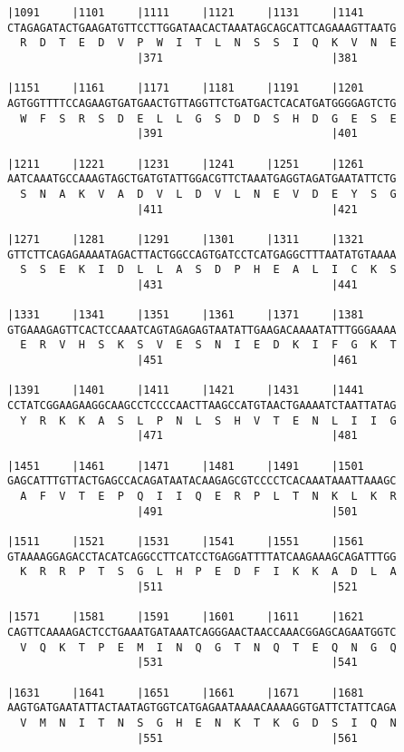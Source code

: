 \documentclass{article}
\begin{document}
\begin{Verbatim}
|1091     |1101     |1111     |1121     |1131     |1141     
CTAGAGATACTGAAGATGTTCCTTGGATAACACTAAATAGCAGCATTCAGAAAGTTAATG
  R  D  T  E  D  V  P  W  I  T  L  N  S  S  I  Q  K  V  N  E
                    |371                          |381      
  
|1151     |1161     |1171     |1181     |1191     |1201     
AGTGGTTTTCCAGAAGTGATGAACTGTTAGGTTCTGATGACTCACATGATGGGGAGTCTG
  W  F  S  R  S  D  E  L  L  G  S  D  D  S  H  D  G  E  S  E
                    |391                          |401      
  
|1211     |1221     |1231     |1241     |1251     |1261     
AATCAAATGCCAAAGTAGCTGATGTATTGGACGTTCTAAATGAGGTAGATGAATATTCTG
  S  N  A  K  V  A  D  V  L  D  V  L  N  E  V  D  E  Y  S  G
                    |411                          |421      
  
|1271     |1281     |1291     |1301     |1311     |1321     
GTTCTTCAGAGAAAATAGACTTACTGGCCAGTGATCCTCATGAGGCTTTAATATGTAAAA
  S  S  E  K  I  D  L  L  A  S  D  P  H  E  A  L  I  C  K  S
                    |431                          |441      
  
|1331     |1341     |1351     |1361     |1371     |1381     
GTGAAAGAGTTCACTCCAAATCAGTAGAGAGTAATATTGAAGACAAAATATTTGGGAAAA
  E  R  V  H  S  K  S  V  E  S  N  I  E  D  K  I  F  G  K  T
                    |451                          |461      
  
|1391     |1401     |1411     |1421     |1431     |1441     
CCTATCGGAAGAAGGCAAGCCTCCCCAACTTAAGCCATGTAACTGAAAATCTAATTATAG
  Y  R  K  K  A  S  L  P  N  L  S  H  V  T  E  N  L  I  I  G
                    |471                          |481      
  
|1451     |1461     |1471     |1481     |1491     |1501     
GAGCATTTGTTACTGAGCCACAGATAATACAAGAGCGTCCCCTCACAAATAAATTAAAGC
  A  F  V  T  E  P  Q  I  I  Q  E  R  P  L  T  N  K  L  K  R
                    |491                          |501      
  
|1511     |1521     |1531     |1541     |1551     |1561     
GTAAAAGGAGACCTACATCAGGCCTTCATCCTGAGGATTTTATCAAGAAAGCAGATTTGG
  K  R  R  P  T  S  G  L  H  P  E  D  F  I  K  K  A  D  L  A
                    |511                          |521      
  
|1571     |1581     |1591     |1601     |1611     |1621     
CAGTTCAAAAGACTCCTGAAATGATAAATCAGGGAACTAACCAAACGGAGCAGAATGGTC
  V  Q  K  T  P  E  M  I  N  Q  G  T  N  Q  T  E  Q  N  G  Q
                    |531                          |541      
  
|1631     |1641     |1651     |1661     |1671     |1681     
AAGTGATGAATATTACTAATAGTGGTCATGAGAATAAAACAAAAGGTGATTCTATTCAGA
  V  M  N  I  T  N  S  G  H  E  N  K  T  K  G  D  S  I  Q  N
                    |551                          |561      
  

\end{Verbatim}
\end{document}
